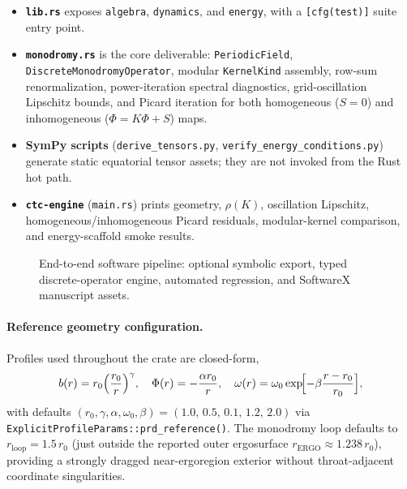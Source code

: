\documentclass[preprint,12pt,a4paper]{elsarticle}
\newcommand{\Phir}{\Phi(r)}
\newcommand{\br}{b(r)}
\newcommand{\omegar}{\omega(r)}
\begin{document}
\begin{itemize}
  \item \textbf{\texttt{lib.rs}} exposes \texttt{algebra}, \texttt{dynamics}, and \texttt{energy}, with a \texttt{[cfg(test)]} suite entry point.
  \item \textbf{\texttt{monodromy.rs}} is the core deliverable: \texttt{PeriodicField}, \texttt{DiscreteMonodromyOperator}, modular \texttt{KernelKind} assembly, row-sum renormalization, power-iteration spectral diagnostics, grid-oscillation Lipschitz bounds, and Picard iteration for both homogeneous ($S=0$) and inhomogeneous ($\Phi=K\Phi+S$) maps.
  \item \textbf{SymPy scripts} (\texttt{derive\_tensors.py}, \texttt{verify\_energy\_conditions.py}) generate static equatorial tensor assets; they are not invoked from the Rust hot path.
  \item \textbf{\texttt{ctc-engine}} (\texttt{main.rs}) prints geometry, $\rho(K)$, oscillation Lipschitz, homogeneous/inhomogeneous Picard residuals, modular-kernel comparison, and energy-scaffold smoke results.
\end{itemize}

\begin{figure}[t]
\centering
{}
\caption{End-to-end software pipeline: optional symbolic export, typed discrete-operator engine, automated regression, and SoftwareX manuscript assets.}
\label{fig:pipeline}
\end{figure}

\paragraph{Reference geometry configuration.}
Profiles used throughout the crate are closed-form,
\begin{equation}
\label{eq:profiles}
\br = r_{0}\Bigl(\frac{r_{0}}{r}\Bigr)^{\gamma},\quad
\Phir = -\frac{\alpha r_{0}}{r},\quad
\omegar = \omega_{0}\exp\!\Bigl[-\beta\frac{r-r_{0}}{r_{0}}\Bigr],
\end{equation}
with defaults $(r_{0},\gamma,\alpha,\omega_{0},\beta)=(1.0,\,0.5,\,0.1,\,1.2,\,2.0)$
via \texttt{ExplicitProfileParams::prd\_reference()}.
The monodromy loop defaults to $r_{\mathrm{loop}}=1.5\,r_{0}$ (just outside the reported outer ergosurface $r_{\mathrm{ERGO}}\approx 1.238\,r_{0}$), providing a strongly dragged near-ergoregion exterior without throat-adjacent coordinate singularities.
\end{document}
